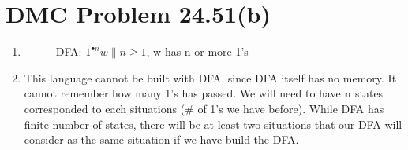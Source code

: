 \documentclass{article}
\def\math#1{$#1$}
\begin{document}
\section{DMC Problem 24.51(b)}
\begin{enumerate}
    \item 
    \begin{figure}[ht] %
    \centering %
    \caption{DFA: \math{1^{•n}w \| n \geq 1}, w has n or more 1’s}
    \label{fig:my_label}
    \end{figure}
    \item This language cannot be built with DFA, since DFA itself has no memory. It cannot remember how many 1's has passed. We will need to have \math{\mathbf{n}} states corresponded to each situations (# of 1's we have before). While DFA has finite number of states, there will be at least two situations that our DFA will consider as the same situation if we have build the DFA.
\end{enumerate}
\end{document}
